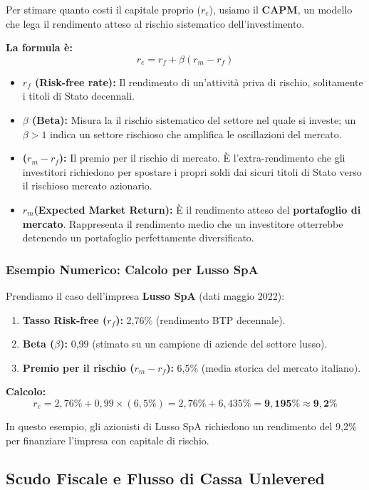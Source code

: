 \documentclass[a4paper,10pt]{article}
\begin{document}
Per stimare quanto costi il capitale proprio ($r_e$), usiamo il \textbf{CAPM}, un modello che lega il rendimento atteso al rischio sistematico dell'investimento. 

\textbf{La formula è:} \[ r_e = r_f + \beta (r_m - r_f) \]

\begin{itemize}
    \item \textbf{$r_f$ (Risk-free rate):} Il rendimento di un'attività priva di rischio, solitamente i titoli di Stato decennali.
    \item \textbf{$\beta$ (Beta):} Misura la il rischio sistematico del settore nel quale si investe; un $\beta > 1$ indica un settore rischioso che amplifica le oscillazioni del mercato.
    \item \textbf{($r_m - r_f$):} Il premio per il rischio di mercato. È l'extra-rendimento che gli investitori richiedono per spostare i propri soldi dai sicuri titoli di Stato verso il rischioso mercato azionario.
    \item \textbf{$r_m$(Expected Market Return):} È il rendimento atteso del \textbf{portafoglio di mercato}. Rappresenta il rendimento medio che un investitore otterrebbe detenendo un portafoglio perfettamente diversificato. 
\end{itemize}

\subsubsection*{Esempio Numerico: Calcolo per Lusso SpA}
Prendiamo il caso dell'impresa \textbf{Lusso SpA} (dati maggio 2022):
\begin{enumerate}
    \item \textbf{Tasso Risk-free ($r_f$):} 2,76\% (rendimento BTP decennale).
    \item \textbf{Beta ($\beta$):} 0,99 (stimato su un campione di aziende del settore lusso).
    \item \textbf{Premio per il rischio ($r_m - r_f$):} 6,5\% (media storica del mercato italiano).
\end{enumerate}

\textbf{Calcolo:} 
\[ r_e = 2,76\% + 0,99 \times (6,5\%) = 2,76\% + 6,435\% = \mathbf{9,195\%} \approx \mathbf{9,2\%} \]

In questo esempio, gli azionisti di Lusso SpA richiedono un rendimento del 9,2\% per finanziare l'impresa con capitale di rischio.

\subsection*{Scudo Fiscale e Flusso di Cassa Unlevered}
\end{document}
